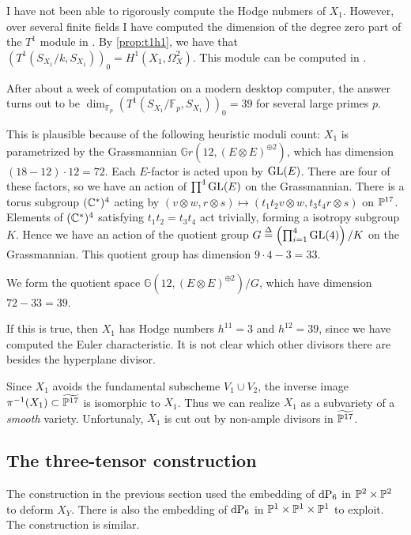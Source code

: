 \begin{remark}
I have not been able to rigorously compute the Hodge nubmers of $X_1$. However, over several finite fields I have computed the dimension of the degree zero part of the $T^1$ module in \MM. By \cref{prop:t1h1}, we have that $(T^1(S_{X_1}/k,S_{X_1}))_0 = H^1(X_1,\Omega^2_X)$. This module can be computed in \MM.

After about a week of computation on a modern desktop computer, the answer turns out to be $\dim_{\mathbb F_p} (T^1(S_{X_1}/\mathbb F_p,S_{X_1}))_0 = 39$ for several large primes $p$.

This is plausible because of the following heuristic moduli count: $X_1$ is parametrized by the Grassmannian $\mathbb Gr(12,(E \otimes E)^{\oplus 2} )$, which has dimension $(18-12)\cdot 12 = 72$. Each $E$-factor is acted upon by $\GL(E)$. There are four of these factors, so we have an action of $\prod^4 \GL(E)$ on the Grassmannian. There is a torus subgroup $(\C^\ast)^4$ acting by $(v \otimes w, r \otimes s) \mapsto (t_1t_2 v \otimes w, t_3t_4 r \otimes s)$ on $\P^{17}$. Elements of $(\C^\ast)^4$ satisfying $t_1t_2=t_3t_4$ act trivially, forming a isotropy subgroup $K$.  Hence we have an action of the quotient group $G \stackrel \Delta = \left(\prod_{i=1}^4 \GL(4)\right)/K$ on the Grassmannian. This quotient group has dimension $9 \cdot 4 - 3 = 33$.

We form the quotient space $\mathbb G(12,(E \otimes E)^{\oplus 2})/G$, which have dimension $72-33=39$.

If this is true, then $X_1$ has Hodge numbers $h^{11}=3$ and $h^{12}=39$, since we have computed the Euler characteristic. It is not clear which other divisors there are besides the hyperplane divisor.
\end{remark}

\begin{remark}
Since $X_1$ avoids the fundamental subscheme $V_1 \cup V_2$, the inverse image $\pi^{-1}(X_1) \subset \widetilde{\P^{17}}$ is isomorphic to $X_1$. Thus we can realize $X_1$ as a subvariety of a \emph{smooth} variety. Unfortunaly, $X_1$ is cut out by non-ample divisors in $\widetilde{\P^{17}}$.
\end{remark}

\subsection{The three-tensor construction}

The construction in the previous section used the embedding of $\dP6$ in $\P^2 \times \P^2$ to deform $X_Y$. There is also the embedding of $\dP6$ in $\P^1 \times \P^1 \times \P^1$ to exploit. The construction is similar.

